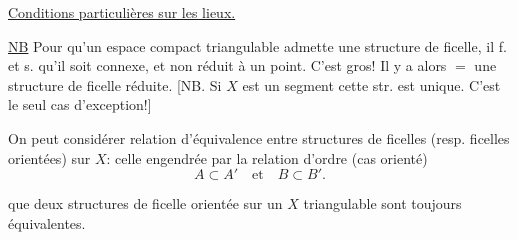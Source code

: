 
\uline{Conditions particulières sur les lieux.}

\uline{NB} Pour qu'un espace compact triangulable admette une structure de ficelle, il f. et s. qu'il soit connexe, et non réduit à un point. C'est gros! Il y a alors $=$ une structure de ficelle réduite. [NB. Si $X$ est un segment cette str. est unique. C'est le seul cas d'exception!]


On peut considérer relation d'équivalence entre structures de ficelles  (resp. ficelles orientées) sur $X$:  celle engendrée par la relation d'ordre (cas orienté)
\[
A\subset A'\quad\text{et}\quad B\subset B'.
\]


 que deux structures de ficelle orientée sur un $X$ triangulable sont toujours équivalentes.

